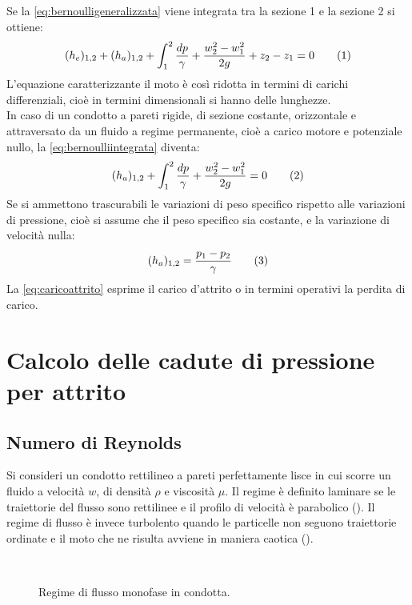 Se la \eqref{eq:bernoulligeneralizzata} viene integrata tra la sezione 1 e la sezione 2 si ottiene:
\[(h_e)_{1,2}+(h_a)_{1,2}+\int^2_1{\frac{dp}{\gamma}}+\frac{w^2_2-w^2_1}{2g}+z_2-z_1=0\label{eq:bernoulliintegrata}\addtag\]
L'equazione caratterizzante il moto è così ridotta in termini di carichi differenziali, cioè in termini dimensionali si hanno delle lunghezze.\\
In caso di un condotto a pareti rigide, di sezione costante, orizzontale e attraversato da un fluido a regime permanente, cioè a carico motore e potenziale nullo, la \eqref{eq:bernoulliintegrata} diventa:
\[(h_a)_{1,2}+\int^2_1{\frac{dp}{\gamma}}+\frac{w^2_2-w^2_1}{2g}=0\label{eq:attritointermedio}\addtag\]
Se si ammettono trascurabili le variazioni di peso specifico rispetto alle variazioni di pressione, cioè si assume che il peso specifico sia costante, e la variazione di velocità nulla:
\[(h_a)_{1,2}=\frac{p_1-p_2}{\gamma}\label{eq:caricoattrito}\addtag\]
La \eqref{eq:caricoattrito} esprime il carico d'attrito o in termini operativi la perdita di carico. 
\section{Calcolo delle cadute di pressione per attrito}
\subsection{Numero di Reynolds}
Si consideri un condotto rettilineo a pareti perfettamente lisce in cui scorre un fluido a velocità \(w\), di densità \(\rho\) e viscosità \(\mu\). Il regime è definito laminare se le traiettorie del flusso sono rettilinee e il profilo di velocità è parabolico (). Il regime di flusso è invece turbolento quando le particelle non seguono traiettorie ordinate e il moto che ne risulta avviene in maniera caotica ().

\begin{figure}[htbp]
\centering
     \qquad \qquad
     \\
\caption{Regime di flusso monofase in condotta.}
\label{fig:laminareturbolento}
\end{figure}

